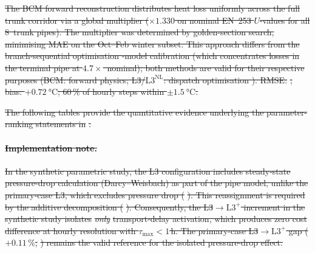 \documentclass[a4paper,fleqn]{cas-sc} %
\providecommand{\DIFdel}[1]{{\protect\color{red}\sout{#1}}} %
\providecommand{\Lplus}{\ensuremath{\mathrm{L3^{+}}}}
\providecommand{\Lnl}{\ensuremath{\mathrm{L3^{\mathrm{NL}}}}}
\providecommand{\Cref}[1]{\ref{#1}}
\begin{document}
{{%

\DIFdel{The BCM forward reconstruction distributes heat loss uniformly
across the full }%
\DIFdel{trunk corridor via a global
multiplier (${\times}1.330$ on nominal EN~253 $U$-values for all
8~trunk pipes). The multiplier was determined by golden-section
search, minimising MAE on the Oct--Feb winter subset.  This
approach differs from the
branch-sequential optimisation -model
calibration (which concentrates losses in the terminal pipe at
$4.7{\times}$~nominal); both methods are valid for their
respective purposes (BCM: forward physics; L3/$\Lnl$: dispatch
optimisation ).  RMSE: }%
\DIFdel{; bias:
${+}\SI{0.72}{\celsius}$; 60\,\% of hourly steps within
${\pm}\SI{1.5}{\celsius}$.
}%


\DIFdel{The following tables provide the quantitative evidence underlying
the parameter-ranking statements in }%
\DIFdel{.
}%

\paragraph{\DIFdel{Implementation note.}}
\addtocounter{paragraph}{-1}%
\DIFdel{In the synthetic parametric study, the L3 configuration includes
steady-state pressure-drop calculation (Darcy--Weisbach) as part
of the pipe model, unlike the primary-case L3, which excludes
pressure drop (}%
\DIFdel{). This reassignment is
required by the additive decomposition
(}%
\DIFdel{).
Consequently, the L3$\to\Lplus$ increment in the synthetic study
isolates }\emph{\DIFdel{only}} %
\DIFdel{transport-delay activation, which produces
zero cost difference at hourly resolution with
$\tau_{\max} < 1$\,h. The primary-case L3$\to\Lplus$ gap
($+0.11\,\%$, }%
\DIFdel{) remains the valid
reference for the isolated pressure-drop effect.
}%

}}
\end{document}
